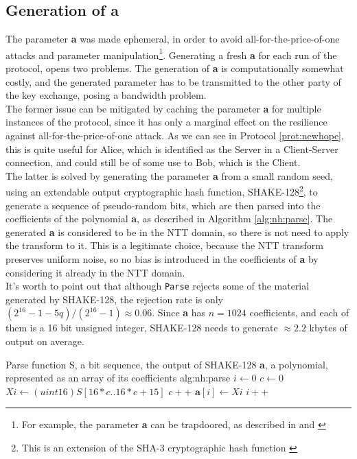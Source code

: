 \subsection{Generation of \textbf{a}}\label{sec:nh:a_generation}
The parameter \textbf{a} was made ephemeral, in order to avoid all-for-the-price-of-one attacks and parameter manipulation\footnote{For example, the parameter \textbf{a} can be trapdoored, as described in \cite{RLWE_trapdoor} and \cite{newhope}}. Generating a fresh \textbf{a} for each run of the protocol, opens two problems. The generation of \textbf{a} is computationally somewhat costly, and the generated parameter has to be transmitted to the other party of the key exchange, posing a bandwidth problem.\\
The former issue can be mitigated by caching the parameter \textbf{a} for multiple instances of the protocol, since it has only a marginal effect on the resilience against all-for-the-price-of-one attack. As we can see in Protocol \ref{prot:newhope}, this is quite useful for Alice, which is identified as the Server in a Client-Server connection, and could still be of some use to Bob, which is the Client.\\
The latter is solved by generating the parameter \textbf{a} from a small random seed, using an extendable output cryptographic hash function, SHAKE-128\footnote{This is an extension of the SHA-3 cryptographic hash function \cite{SHA3_FIPS}}, to generate a sequence of pseudo-random bits, which are then parsed into the coefficients of the polynomial \textbf{a}, as described in Algorithm \ref{alg:nh:parse}. The generated \textbf{a} is considered to be in the NTT domain, so there is not need to apply the transform to it. This is a legitimate choice, because the NTT transform preserves uniform noise, so no bias is introduced in the coefficients of \textbf{a} by considering it already in the NTT domain.\\
It's worth to point out that although \verb|Parse| rejects some of the material generated by SHAKE-128, the rejection rate is only $(2^{16}-1-5q)/(2^{16}-1) \approx 0.06$. Since \textbf{a} has $n=1024$ coefficients, and each of them is a 16 bit unsigned integer, SHAKE-128 needs to generate $\approx 2.2$ kbytes of output on average.
\begin{b_algorithm}{Parse function}
{S, a bit sequence, the output of SHAKE-128}
{\textbf{a}, a polynomial, represented as an array of its coefficients}
{alg:nh:parse}
\STATE $i \gets 0$
\STATE $c \gets 0$
    \STATE $Xi \gets (uint16)S[16*c .. 16*c+15]$
    \STATE $c++$
        \STATE $\textbf{a}[i] \gets Xi$
        \STATE $i++$
    \ENDIF
\ENDWHILE
\end{b_algorithm}

